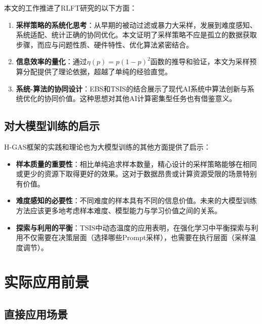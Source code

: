 本文的工作推进了RLFT研究的以下方面：

\begin{enumerate}
    \item \textbf{采样策略的系统化思考}：从早期的被动过滤或暴力大采样，发展到难度感知、系统适配、统计正确的协同优化。本文证明了采样策略不应是孤立的数据获取步骤，而应与问题性质、硬件特性、优化算法紧密结合。
    
    \item \textbf{信息效率的量化}：通过$\eta(p) = p(1-p)^2$函数的推导和验证，本文为采样预算分配提供了理论依据，超越了单纯的经验直觉。
    
    \item \textbf{系统-算法的协同设计}：EBS和TSIS的结合展示了现代AI系统中算法创新与系统优化的协同价值。这种思想对其他AI计算密集型任务也有借鉴意义。
\end{enumerate}

\subsection{对大模型训练的启示}
\label{subsec:insights_for_llm_training}

H-GAS框架的实践和理论也为大模型训练的其他方面提供了启示：

\begin{itemize}
    \item \textbf{样本质量的重要性}：相比单纯追求样本数量，精心设计的采样策略能够在相同或更少的资源下取得更好的效果。这对于数据昂贵或计算资源受限的场景特别有价值。
    
    \item \textbf{难度感知的必要性}：不同难度的样本具有不同的信息价值。未来的大模型训练方法应该更多地考虑样本难度、模型能力与学习价值之间的关系。
    
    \item \textbf{探索与利用的平衡}：TSIS中动态温度的应用表明，在强化学习中平衡探索与利用不仅需要在决策层面（选择哪些Prompt采样），也需要在执行层面（采样温度调节）。
\end{itemize}

\section{实际应用前景}
\label{sec:practical_prospects}

\subsection{直接应用场景}
\label{subsec:direct_applications}

